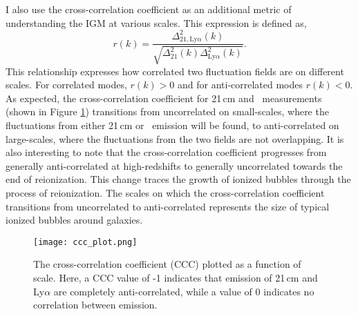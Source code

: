 I also use the cross-correlation coefficient as an additional metric of understanding
the IGM at various scales. This expression is defined as,
\begin{equation}
  r \left(k \right) = \frac{\Delta^2_{21, \textrm{Ly} \alpha}\left(k \right)}
                           {\sqrt{\Delta^2_{21} \left(k \right)\Delta^2_{\textrm{Ly} \alpha} \left(k \right)}}.
\end{equation}
This relationship expresses how correlated two fluctuation fields are on different
scales. For correlated modes, $r \left(k \right) > 0$ and for anti-correlated modes
$r \left(k \right) < 0$. As expected, the cross-correlation coefficient for 21\,cm and
\lya\ measurements (shown in Figure \ref{fig:ccc}) transitions from uncorrelated on
small-scales, where the fluctuations from either 21\,cm or \lya\ emission will be found,
to anti-correlated on large-scales, where the fluctuations from the two fields
are not overlapping. It is also interesting to note that the cross-correlation coefficient
progresses from generally anti-correlated at high-redshifts to generally uncorrelated towards
the end of reionization. This change traces the growth of ionized bubbles through
the process of reionization. The scales on which the cross-correlation coefficient
transitions from uncorrelated to anti-correlated represents the size of typical ionized
bubbles around galaxies.

\begin{figure}[ht]
	\centering
	\texttt{[image: ccc\_plot.png]}
	\caption[Cross-Correlation Coefficient]{The cross-correlation coefficient (CCC) plotted as a function of scale. Here, a CCC value of
           -1 indicates that emission of 21\,cm and Ly$\alpha$ are completely anti-correlated, while a value of 0 indicates no correlation
           between emission.}
	\label{fig:ccc}
\end{figure}
